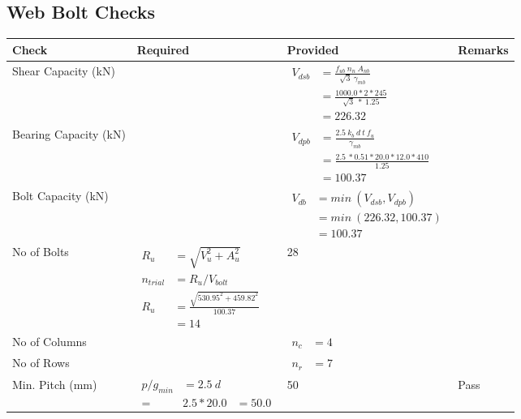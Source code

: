 \documentclass{article}%
\begin{document}
\subsection{Web Bolt Checks}%
\label{subsec:WebBoltChecks}%
\renewcommand{\arraystretch}{1.2}%
\begin{longtable}{|p{4cm}|p{5cm}|p{5.5cm}|p{1.5cm}|}%
\hline%
\rowcolor{OsdagGreen}%
Check&Required&Provided&Remarks\\%
\hline%
\endhead%
\hline%
Shear Capacity (kN)&&$\begin{aligned}V_{dsb} &= \frac{f_{ub} ~n_n~ A_{nb}}{\sqrt{3} ~\gamma_{mb}}\\ &= \frac{1000.0*2*245}{\sqrt{3}~*~1.25}\\ &= 226.32\end{aligned}$&\\%
\hline%
Bearing Capacity (kN)&&$\begin{aligned}V_{dpb} &= \frac{2.5~ k_b~ d~ t~ f_u}{\gamma_{mb}}\\ &= \frac{2.5~*0.51*20.0*12.0*410}{1.25}\\ &=100.37\end{aligned}$&\\%
\hline%
Bolt Capacity (kN)&&$\begin{aligned}V_{db} &= min~ (V_{dsb}, V_{dpb})\\ &= min~ (226.32,100.37)\\ &=100.37\end{aligned}$&\\%
\hline%
No of Bolts&$\begin{aligned}R_{u} &= \sqrt{V_u^2+A_u^2}\\ n_{trial} &= R_u/ V_{bolt}\\ R_{u} &= \frac{\sqrt{530.95^2+459.82^2}}{100.37}\\ &=14\end{aligned}$&28&\\%
\hline%
No of Columns&&$\begin{aligned} n_c &=4\end{aligned}$&\\%
\hline%
No of Rows&&$\begin{aligned} n_r &=7\end{aligned}$&\\%
\hline%
Min. Pitch (mm)&$\begin{aligned}p/g_{min}&= 2.5 ~ d&\\ =&2.5*20.0&=50.0\end{aligned}$&50&Pass\\%
\hline%

\end{longtable}
\end{document}
